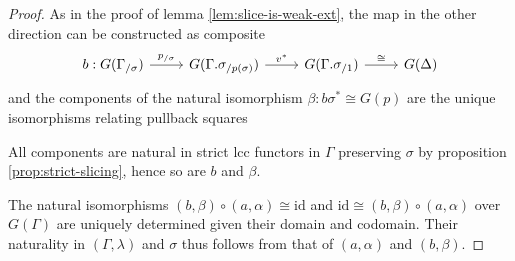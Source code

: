 \documentclass{article}
\theoremstyle{remark}
\theoremstyle{definition}
\begin{document}
\begin{proof}
  As in the proof of lemma \ref{lem:slice-is-weak-ext}, the map in the other direction can be constructed as composite
  \begin{equation}
    \begin{tikzcd}
      b : G(\Gamma_{/ \sigma}) \arrow[r, "p_{/ \sigma}"] & G(\Gamma.\sigma_{/ p(\sigma)}) \arrow[r, "v^*"] & G(\Gamma.\sigma_{/ 1}) \arrow[r, "\cong"] & G(\Delta)
    \end{tikzcd}
  \end{equation}
  and the components of the natural isomorphism $\beta : b \sigma^* \cong G(p)$ are the unique isomorphisms relating pullback squares
  All components are natural in strict lcc functors in $\Gamma$ preserving $\sigma$ by proposition \ref{prop:strict-slicing}, hence so are $b$ and $\beta$.

  The natural isomorphisms $(b, \beta) \circ (a, \alpha) \cong \mathrm{id}$ and $\mathrm{id} \cong (b, \beta) \circ (a, \alpha)$ over $G(\Gamma)$ are uniquely determined given their domain and codomain.
  Their naturality in $(\Gamma, \lambda)$ and $\sigma$ thus follows from that of $(a, \alpha)$ and $(b, \beta)$.
\end{proof}
\end{document}

